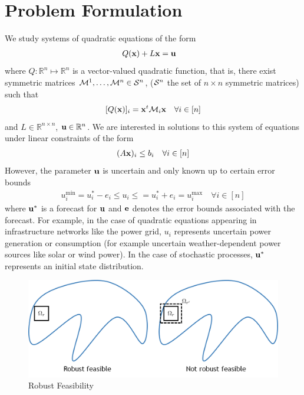 \section{Problem Formulation} \label{sec:probform}  

We study systems of quadratic equations of the form
\begin{align}
& Q(\bold x)+L\bold x=\bold u\label{eq:Quad}
\end{align}
where $Q: \mathbb{R}^n \mapsto \mathbb{R}^n$ is a vector-valued quadratic function, that is, there exist symmetric matrices $\mathcal{M}^1,\ldots,\mathcal{M}^{n} \in \mathcal{S}^{n}$, ($\mathcal{S}^{n}$ the set of $n \times n$ symmetric matrices) such that
\[[Q(\bold x)]_i = \bold x^t \mathcal{M}_{i} \bold x \quad \forall i \in [n]\]
and $L \in \mathbb{R}^{n\times n}$, $\bold u \in \mathbb{R}^n$. 
We are interested in solutions to this system of equations under linear constraints of the form
\begin{align}
(A\bold x)_i\leq b_i \quad \forall i \in [n]\label{eq:xLimits}
\end{align}
However, the parameter $\bold u$ is uncertain and only known up to certain error bounds
\begin{align}
u^{\min}_i=u_i^*-e_i \leq u_i \leq =u_i^*+e_i=u^{\max}_i \quad \forall i \in [n] \label{eq:uLimits}
\end{align}
where $\bold u^*$ is a forecast for $\bold u$ and $\bold e$ denotes the error bounds associated with the forecast. 
For example, in the case of quadratic equations appearing in infrastructure networks like the power grid, $u_i$ represents uncertain power generation or consumption (for example uncertain weather-dependent power sources like solar or wind power). 
In the case of stochastic processes, $\bold u^*$ represents an initial state distribution.

\begin{figure}[htp!]
\begin{center}
\includegraphics[scale=1]{Figures/Robfeas} %
\end{center}
\caption{Robust Feasibility}
\label{fig:RFeas}
\end{figure}

